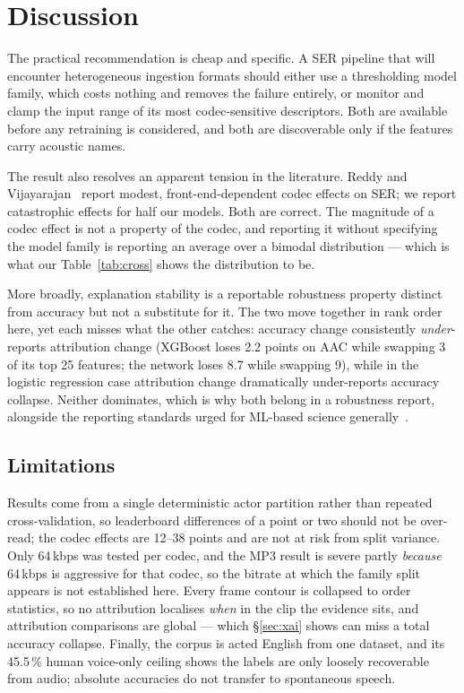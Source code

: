\documentclass[a4paper,9pt,twocolumn]{extarticle}
\begin{document}
\section{Discussion}
The practical recommendation is cheap and specific. A SER pipeline that will
encounter heterogeneous ingestion formats should either use a thresholding
model family, which costs nothing and removes the failure entirely, or monitor
and clamp the input range of its most codec-sensitive descriptors. Both are
available before any retraining is considered, and both are discoverable only
if the features carry acoustic names.

The result also resolves an apparent tension in the literature. Reddy and
Vijayarajan~\cite{reddy2020compression} report modest, front-end-dependent
codec effects on SER; we report catastrophic effects for half our models. Both
are correct. The magnitude of a codec effect is not a property of the codec,
and reporting it without specifying the model family is reporting an average
over a bimodal distribution --- which is what our Table~\ref{tab:cross} shows
the distribution to be.

More broadly, explanation stability is a reportable robustness property
distinct from accuracy but not a substitute for it. The two move together in
rank order here, yet each misses what the other catches: accuracy change
consistently \emph{under}-reports attribution change (XGBoost loses 2.2 points
on AAC while swapping 3 of its top 25 features; the network loses 8.7 while
swapping 9), while in the logistic regression case attribution change
dramatically under-reports accuracy collapse. Neither dominates, which is why
both belong in a robustness report, alongside the reporting standards urged for
ML-based science generally~\cite{kapoor2024reforms}.

\subsection{Limitations}
Results come from a single deterministic actor partition rather than repeated
cross-validation, so leaderboard differences of a point or two should not be
over-read; the codec effects are 12--38 points and are not at risk from split
variance. Only 64\,kbps was tested per codec, and the MP3 result is severe
partly \emph{because} 64\,kbps is aggressive for that codec, so the bitrate at
which the family split appears is not established here. Every frame contour is
collapsed to order statistics, so no attribution localises \emph{when} in the
clip the evidence sits, and attribution comparisons are global --- which
\S\ref{sec:xai} shows can miss a total accuracy collapse. Finally, the corpus
is acted English from one dataset, and its 45.5\,\% human voice-only ceiling
shows the labels are only loosely recoverable from audio; absolute accuracies
do not transfer to spontaneous speech.
\end{document}
